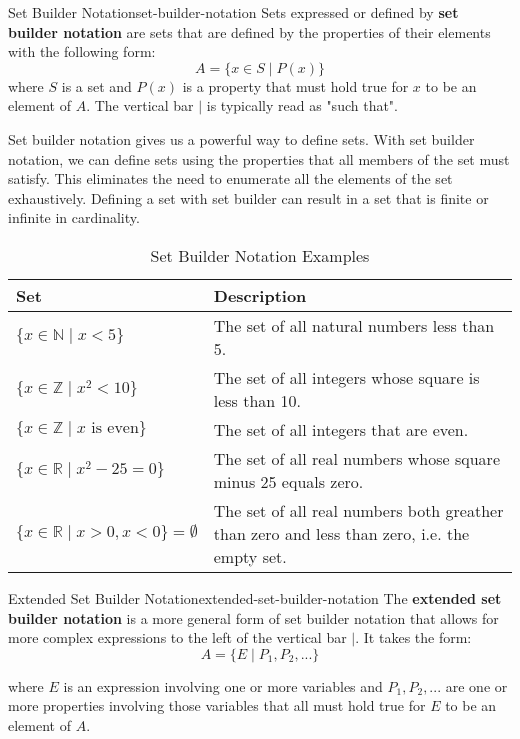\begin{definition}{Set Builder Notation}{set-builder-notation}
  Sets expressed or defined by \textbf{set builder notation} are sets that are defined by
  the properties of their elements with the following form:
  \[
    A = \{ x \in S \mid P(x) \}
  \]
  where \( S \) is a set and \( P(x) \) is a property that must hold true for \( x \) to be
  an element of \( A \). The vertical bar \( | \) is typically read as "such that".
\end{definition}

Set builder notation gives us a powerful way to define sets. With set builder notation, we can
define sets using the properties that all members of the set must satisfy. This eliminates the
need to enumerate all the elements of the set exhaustively. Defining a set with set builder
can result in a set that is finite or infinite in cardinality.

\begin{table}[H]
  \centering
  \begin{tabular}{p{2in} p{3in}}
    \toprule
    \textbf{Set} & \textbf{Description} \\
    \midrule
    \( \{ x \in \mathbb{N} \mid x < 5 \} \) & The set of all natural numbers less than 5. \\
    \( \{ x \in \mathbb{Z} \mid x^2 < 10 \} \) & The set of all integers whose square is less than 10. \\
    \( \{ x \in \mathbb{Z} \mid x \text{ is even} \} \) & The set of all integers that are even. \\
    \( \{ x \in \mathbb{R} \mid x^2 - 25 = 0\} \) & The set of all real numbers whose square minus 25 equals zero.\\
    \( \{ x \in \mathbb{R} \mid x > 0, x < 0\} = \emptyset \) &
      The set of all real numbers both greather than zero and less than zero, i.e. the empty set.  \\
    \end{tabular}
  \caption{Set Builder Notation Examples}
\end{table}

\begin{definition}{Extended Set Builder Notation}{extended-set-builder-notation}
  The \textbf{extended set builder notation} is a more general form of set builder notation
  that allows for more complex expressions to the left of the vertical bar \( | \).
  It takes the form:
  \[
    A = \{ E \mid P_1, P_2, ... \}
  \]

  where \( E \) is an expression involving one or more variables and \( P_1, P_2, ... \) are
  one or more properties involving those variables that all must hold true for \( E \) to be an
  element of \( A \).
\end{definition}


